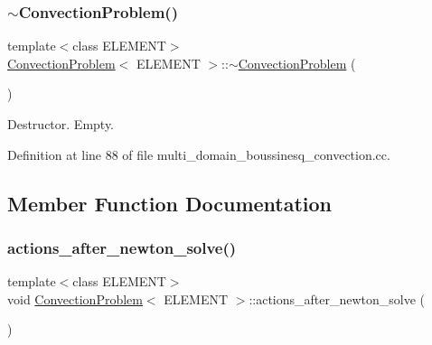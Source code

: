 \subsubsection{\texorpdfstring{$\sim$\+Convection\+Problem()}{~ConvectionProblem()}\hspace{0.1cm}{\footnotesize\ttfamily [2/2]}}
{\footnotesize\ttfamily template$<$class E\+L\+E\+M\+E\+NT$>$ \\
\hyperlink{classConvectionProblem}{Convection\+Problem}$<$ E\+L\+E\+M\+E\+NT $>$\+::$\sim$\hyperlink{classConvectionProblem}{Convection\+Problem} (\begin{DoxyParamCaption}{ }\end{DoxyParamCaption})\hspace{0.3cm}{\ttfamily [inline]}}



Destructor. Empty. 



Definition at line 88 of file multi\+\_\+domain\+\_\+boussinesq\+\_\+convection.\+cc.



\subsection{Member Function Documentation}
\mbox{\label{classConvectionProblem_a6b6c035decf5f1e2aa64b591563e5ae4}} 
\subsubsection{\texorpdfstring{actions\+\_\+after\+\_\+newton\+\_\+solve()}{actions\_after\_newton\_solve()}\hspace{0.1cm}{\footnotesize\ttfamily [1/2]}}
{\footnotesize\ttfamily template$<$class E\+L\+E\+M\+E\+NT$>$ \\
void \hyperlink{classConvectionProblem}{Convection\+Problem}$<$ E\+L\+E\+M\+E\+NT $>$\+::actions\+\_\+after\+\_\+newton\+\_\+solve (\begin{DoxyParamCaption}{ }\end{DoxyParamCaption})\hspace{0.3cm}{\ttfamily [inline]}}



